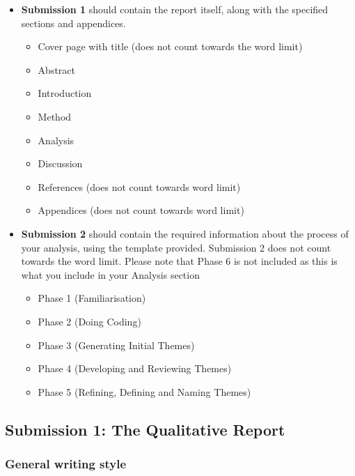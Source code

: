 \documentclass[
  english,
  letterpaper,
  DIV=11,
  numbers=noendperiod]{scrreprt}
\providecommand{\tightlist}{%
  \setlength{\itemsep}{0pt}\setlength{\parskip}{0pt}}
\begin{document}
\begin{itemize}
\tightlist
\item
  \textbf{Submission 1} should contain the report itself, along with the
  specified sections and appendices.

  \begin{itemize}
  \tightlist
  \item
    Cover page with title (does not count towards the word limit)
  \item
    Abstract
  \item
    Introduction
  \item
    Method
  \item
    Analysis
  \item
    Discussion
  \item
    References (does not count towards word limit)
  \item
    Appendices (does not count towards word limit)
  \end{itemize}
\item
  \textbf{Submission 2} should contain the required information about
  the process of your analysis, using the template provided. Submission
  2 does not count towards the word limit. Please note that Phase 6 is
  not included as this is what you include in your Analysis section

  \begin{itemize}
  \tightlist
  \item
    Phase 1 (Familiarisation)
  \item
    Phase 2 (Doing Coding)
  \item
    Phase 3 (Generating Initial Themes)
  \item
    Phase 4 (Developing and Reviewing Themes)
  \item
    Phase 5 (Refining, Defining and Naming Themes)
  \end{itemize}
\end{itemize}

\subsection{Submission 1: The Qualitative
Report}\label{submission-1-the-qualitative-report}

\subsubsection{General writing style}\label{general-writing-style}
\end{document}
